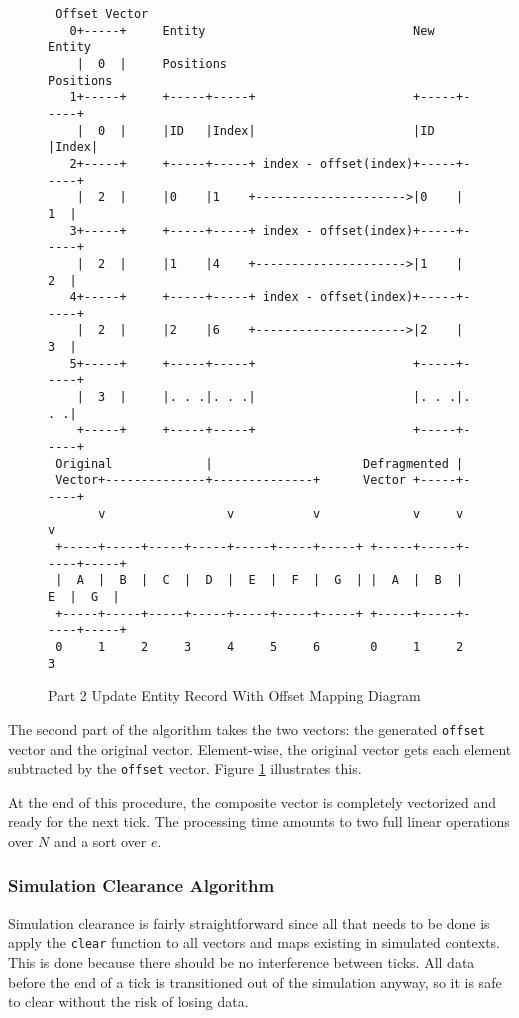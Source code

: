 \begin{figure}[H]
\begin{verbatim}                                                                 
 Offset Vector                                                                 
   0+-----+     Entity                             New Entity             
    |  0  |     Positions                          Positions                        
   1+-----+     +-----+-----+                      +-----+-----+            
    |  0  |     |ID   |Index|                      |ID   |Index|            
   2+-----+     +-----+-----+ index - offset(index)+-----+-----+            
    |  2  |     |0    |1    +--------------------->|0    |  1  |            
   3+-----+     +-----+-----+ index - offset(index)+-----+-----+            
    |  2  |     |1    |4    +--------------------->|1    |  2  |            
   4+-----+     +-----+-----+ index - offset(index)+-----+-----+            
    |  2  |     |2    |6    +--------------------->|2    |  3  |            
   5+-----+     +-----+-----+                      +-----+-----+            
    |  3  |     |. . .|. . .|                      |. . .|. . .|            
    +-----+     +-----+-----+                      +-----+-----+            
 Original             |                     Defragmented |                  
 Vector+--------------+--------------+      Vector +-----+-----+            
       v                 v           v             v     v     v            
 +-----+-----+-----+-----+-----+-----+-----+ +-----+-----+-----+-----+      
 |  A  |  B  |  C  |  D  |  E  |  F  |  G  | |  A  |  B  |  E  |  G  |      
 +-----+-----+-----+-----+-----+-----+-----+ +-----+-----+-----+-----+      
 0     1     2     3     4     5     6       0     1     2     3            
\end{verbatim}
\caption{Part 2 Update Entity Record With Offset Mapping Diagram}
\label{code:defrag_thing}
\end{figure}

The second part of the algorithm takes the two vectors: the generated \texttt{offset} vector and the original vector. Element-wise, the original vector gets each element subtracted by the \texttt{offset} vector. Figure \ref{code:defrag_thing} illustrates this.

At the end of this procedure, the composite vector is completely vectorized and ready for the next tick. The processing time amounts to two full linear operations over $N$ and a sort over $e$.

\subsubsection{Simulation Clearance Algorithm}
Simulation clearance is fairly straightforward since all that needs to be done is apply the \texttt{clear} function to all vectors and maps existing in simulated contexts. This is done because there should be no interference between ticks. All data before the end of a tick is transitioned out of the simulation anyway, so it is safe to clear without the risk of losing data.

